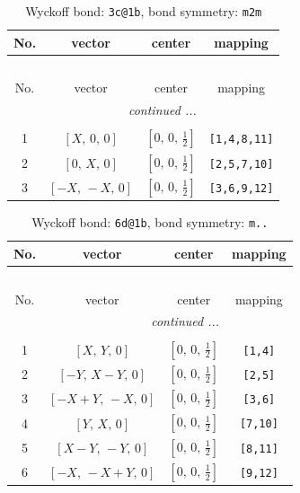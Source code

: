 \documentclass[fleqn,8pt]{jsarticle}
\begin{document}
\begin{longtable}{cccc}
\caption{Wyckoff bond: {\tt 3c@1b}, bond symmetry: {\tt m2m}}
 \\
 \hline \hline
No. & vector & center & mapping \\ \hline \endfirsthead

\multicolumn{3}{l}{\tablename\ \thetable{}} \\
 \hline \hline
No. & vector & center & mapping \\ \hline \endhead

 \hline \hline
\multicolumn{3}{r}{\footnotesize\it continued ...} \\ \endfoot

 \hline \hline
\multicolumn{3}{r}{} \\ \endlastfoot

1 & $\left[ X,\, 0,\, 0 \right]$ & $\left[ 0,\, 0,\, \frac{1}{2} \right]$ & {\tt [1,4,8,11]} \\ \hline
2 & $\left[ 0,\, X,\, 0 \right]$ & $\left[ 0,\, 0,\, \frac{1}{2} \right]$ & {\tt [2,5,7,10]} \\ \hline
3 & $\left[ - X,\, - X,\, 0 \right]$ & $\left[ 0,\, 0,\, \frac{1}{2} \right]$ & {\tt [3,6,9,12]} \\
\end{longtable}
\renewcommand{\arraystretch}{1.2}
\begin{longtable}{cccc}
\caption{Wyckoff bond: {\tt 6d@1b}, bond symmetry: {\tt m..}}
 \\
 \hline \hline
No. & vector & center & mapping \\ \hline \endfirsthead

\multicolumn{3}{l}{\tablename\ \thetable{}} \\
 \hline \hline
No. & vector & center & mapping \\ \hline \endhead

 \hline \hline
\multicolumn{3}{r}{\footnotesize\it continued ...} \\ \endfoot

 \hline \hline
\multicolumn{3}{r}{} \\ \endlastfoot

1 & $\left[ X,\, Y,\, 0 \right]$ & $\left[ 0,\, 0,\, \frac{1}{2} \right]$ & {\tt [1,4]} \\ \hline
2 & $\left[ - Y,\, X - Y,\, 0 \right]$ & $\left[ 0,\, 0,\, \frac{1}{2} \right]$ & {\tt [2,5]} \\ \hline
3 & $\left[ - X + Y,\, - X,\, 0 \right]$ & $\left[ 0,\, 0,\, \frac{1}{2} \right]$ & {\tt [3,6]} \\ \hline
4 & $\left[ Y,\, X,\, 0 \right]$ & $\left[ 0,\, 0,\, \frac{1}{2} \right]$ & {\tt [7,10]} \\ \hline
5 & $\left[ X - Y,\, - Y,\, 0 \right]$ & $\left[ 0,\, 0,\, \frac{1}{2} \right]$ & {\tt [8,11]} \\ \hline
6 & $\left[ - X,\, - X + Y,\, 0 \right]$ & $\left[ 0,\, 0,\, \frac{1}{2} \right]$ & {\tt [9,12]} \\
\end{longtable}
\end{document}

